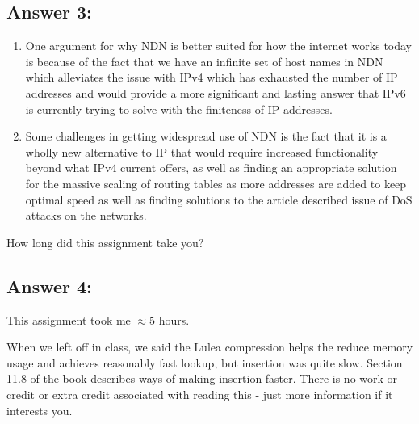 \documentclass[10pt]{article}
\newenvironment{problem}[2][Problem]{\begin{trivlist}
\item[\hskip \labelsep {\bfseries #1}\hskip \labelsep {\bfseries #2.}]}{\end{trivlist}}
\begin{document}
\subsection*{Answer 3:}
\begin{enumerate}
    \item One argument for why NDN is better suited for how the internet works today is because of the fact that we have an infinite set of host names in NDN which alleviates the issue with IPv4 which has exhausted the number of IP addresses and would provide a more significant and lasting answer that IPv6 is currently trying to solve with the finiteness of IP addresses.
    \item Some challenges in getting widespread use of NDN is the fact that it is a wholly new alternative to IP that would require increased functionality beyond what IPv4 current offers, as well as finding an appropriate solution for the massive scaling of routing tables as more addresses are added to keep optimal speed as well as finding solutions to the article described issue of DoS attacks on the networks.
\end{enumerate}

\begin{problem}{4}
How long did this assignment take you?
\end{problem}
\subsection*{Answer 4:}
This assignment took me $\approx 5$ hours.
\begin{problem}{5: Extra (optional) reading}
When we left off in class, we said the Lulea compression helps the reduce memory usage and achieves reasonably fast lookup, but insertion was quite slow. Section 11.8 of the book describes ways of making insertion faster. There is no work or credit or extra credit associated with reading this - just more information if it interests you.
\end{problem}
\end{document}

